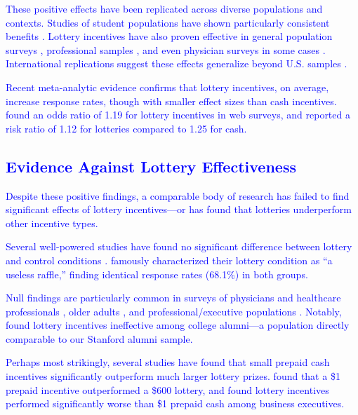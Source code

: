 \documentclass[12pt]{article}
\begin{document}
\textcolor{blue}{These positive effects have been replicated across diverse populations and contexts. Studies of student populations have shown particularly consistent benefits \citep{laguilles2011, larose2014, sanchez-fernandez2010, porter2003}. Lottery incentives have also proven effective in general population surveys \citep{olsen2012, johansson1997, pedersen2016, woodward1985, marrett1992}, professional samples \citep{london1990, bosnjak2003, angur1995}, and even physician surveys in some cases \citep{baron2001, robertson2005, drummond2014}. International replications suggest these effects generalize beyond U.S. samples \citep{angur1995, johansson1997, conn2024}.}

\textcolor{blue}{Recent meta-analytic evidence confirms that lottery incentives, on average, increase response rates, though with smaller effect sizes than cash incentives. \citet{goritz2006} found an odds ratio of 1.19 for lottery incentives in web surveys, and \citet{abdelazeem2023} reported a risk ratio of 1.12 for lotteries compared to 1.25 for cash.}

\textcolor{blue}{\subsection{Evidence Against Lottery Effectiveness}}

\textcolor{blue}{Despite these positive findings, a comparable body of research has failed to find significant effects of lottery incentives---or has found that lotteries underperform other incentive types.}

\textcolor{blue}{Several well-powered studies have found no significant difference between lottery and control conditions \citep{warriner1996, harris2008, lipps2010, brennan1993, mortagy1985}. \citet{mortagy1985} famously characterized their lottery condition as ``a useless raffle,'' finding identical response rates (68.1\%) in both groups.}

\textcolor{blue}{Null findings are particularly common in surveys of physicians and healthcare professionals \citep{moses2004, cottrell2015, grava-gubins2008, halpern2011, ulrich2005, dykema2011, gallagher2001, mclaren2000, so2018}, older adults \citep{finsen2006, gjostein2016, roberts2000}, and professional/executive populations \citep{lorenzi1988, coryn2020, golden1981}. Notably, \citet{denton1991} found lottery incentives ineffective among college alumni---a population directly comparable to our Stanford alumni sample.}

\textcolor{blue}{Perhaps most strikingly, several studies have found that small prepaid cash incentives significantly outperform much larger lottery prizes. \citet{larson2003} found that a \$1 prepaid incentive outperformed a \$600 lottery, and \citet{lorenzi1988} found lottery incentives performed significantly worse than \$1 prepaid cash among business executives.}
\end{document}
